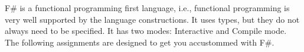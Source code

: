F\# is a functional programming first language, i.e., functional programming is very well supported by the language constructions. It uses types, but they do not always need to be specified. It has two modes: Interactive and Compile mode. The following assignments are designed to get you accustommed with F\#.